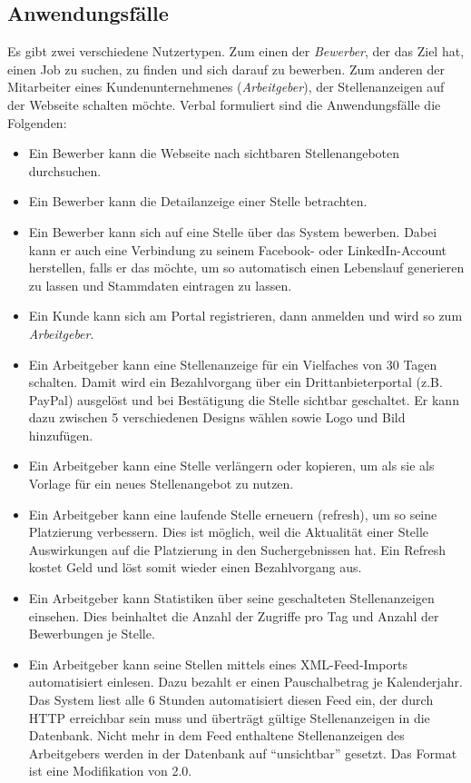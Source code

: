 \subsection{Anwendungsfälle}
Es gibt zwei verschiedene Nutzertypen. Zum einen der \textit{Bewerber}, der das Ziel hat, einen Job zu suchen, zu finden und sich darauf zu bewerben. Zum anderen der Mitarbeiter eines Kundenunternehmenes (\textit{Arbeitgeber}), der Stellenanzeigen auf der Webseite schalten möchte.
Verbal formuliert sind die Anwendungsfälle die Folgenden:
\begin{itemize}
 \item Ein Bewerber kann die Webseite nach sichtbaren Stellenangeboten durchsuchen.
 \item Ein Bewerber kann die Detailanzeige einer Stelle betrachten.
 \item Ein Bewerber kann sich auf eine Stelle über das System bewerben. Dabei kann er auch eine Verbindung zu seinem Facebook- oder LinkedIn-Account herstellen, falls er das möchte, um so automatisch einen Lebenslauf generieren zu lassen und Stammdaten eintragen zu lassen.
 \item Ein Kunde kann sich am Portal registrieren, dann anmelden und wird so zum \textit{Arbeitgeber}.
 \item Ein Arbeitgeber kann eine Stellenanzeige für ein Vielfaches von 30 Tagen schalten. Damit wird ein Bezahlvorgang über ein Drittanbieterportal (z.B. PayPal) ausgelöst und bei Bestätigung die Stelle sichtbar geschaltet. Er kann dazu zwischen 5 verschiedenen Designs wählen sowie Logo und Bild hinzufügen.
 \item Ein Arbeitgeber kann eine Stelle verlängern oder kopieren, um als sie als Vorlage für ein neues Stellenangebot zu nutzen.
 \item Ein Arbeitgeber kann eine laufende Stelle erneuern (refresh), um so seine Platzierung verbessern. Dies ist möglich, weil die Aktualität einer Stelle Auswirkungen auf die Platzierung in den Suchergebnissen hat. Ein Refresh kostet Geld und löst somit wieder einen Bezahlvorgang aus.
 \item Ein Arbeitgeber kann Statistiken über seine geschalteten Stellenanzeigen einsehen. Dies beinhaltet die Anzahl der Zugriffe pro Tag und Anzahl der Bewerbungen je Stelle.
 \item Ein Arbeitgeber kann seine Stellen mittels eines XML-Feed-Imports automatisiert einlesen. Dazu bezahlt er einen Pauschalbetrag je Kalenderjahr. Das System liest alle 6 Stunden automatisiert diesen Feed ein, der durch HTTP erreichbar sein muss und überträgt gültige Stellenanzeigen in die Datenbank. Nicht mehr in dem Feed enthaltene Stellenanzeigen des Arbeitgebers werden in der Datenbank auf "`unsichtbar"' gesetzt. Das Format ist eine Modifikation von  2.0.
\end{itemize}



